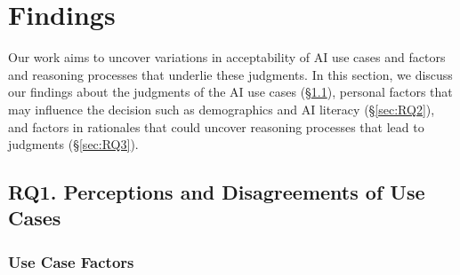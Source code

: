 \section{Findings}
Our work aims to uncover variations in acceptability of AI use cases and factors and reasoning processes that underlie these judgments. In this section, we discuss our findings about the judgments of the AI use cases (\S\ref{sec:RQ1}), personal factors that may influence the decision such as demographics and AI literacy (\S\ref{sec:RQ2}), and factors in rationales that could uncover reasoning processes that lead to judgments (\S\ref{sec:RQ3}).

\subsection{RQ1. Perceptions and Disagreements of Use Cases}
\label{sec:RQ1}
\subsubsection{Use Case Factors}
\label{sssec:findings-use-case-factors}


